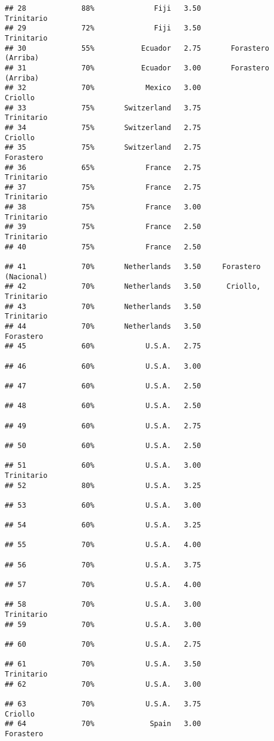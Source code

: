 \documentclass[
]{article}
\begin{document}
\begin{verbatim}
## 28             88%              Fiji   3.50               Trinitario
## 29             72%              Fiji   3.50               Trinitario
## 30             55%           Ecuador   2.75       Forastero (Arriba)
## 31             70%           Ecuador   3.00       Forastero (Arriba)
## 32             70%            Mexico   3.00                  Criollo
## 33             75%       Switzerland   3.75               Trinitario
## 34             75%       Switzerland   2.75                  Criollo
## 35             75%       Switzerland   2.75                Forastero
## 36             65%            France   2.75               Trinitario
## 37             75%            France   2.75               Trinitario
## 38             75%            France   3.00               Trinitario
## 39             75%            France   2.50               Trinitario
## 40             75%            France   2.50                         
## 41             70%       Netherlands   3.50     Forastero (Nacional)
## 42             70%       Netherlands   3.50      Criollo, Trinitario
## 43             70%       Netherlands   3.50               Trinitario
## 44             70%       Netherlands   3.50                Forastero
## 45             60%            U.S.A.   2.75                         
## 46             60%            U.S.A.   3.00                         
## 47             60%            U.S.A.   2.50                         
## 48             60%            U.S.A.   2.50                         
## 49             60%            U.S.A.   2.75                         
## 50             60%            U.S.A.   2.50                         
## 51             60%            U.S.A.   3.00               Trinitario
## 52             80%            U.S.A.   3.25                         
## 53             60%            U.S.A.   3.00                         
## 54             60%            U.S.A.   3.25                         
## 55             70%            U.S.A.   4.00                         
## 56             70%            U.S.A.   3.75                         
## 57             70%            U.S.A.   4.00                         
## 58             70%            U.S.A.   3.00               Trinitario
## 59             70%            U.S.A.   3.00                         
## 60             70%            U.S.A.   2.75                         
## 61             70%            U.S.A.   3.50               Trinitario
## 62             70%            U.S.A.   3.00                         
## 63             70%            U.S.A.   3.75                  Criollo
## 64             70%             Spain   3.00                Forastero

\end{verbatim}
\end{document}
